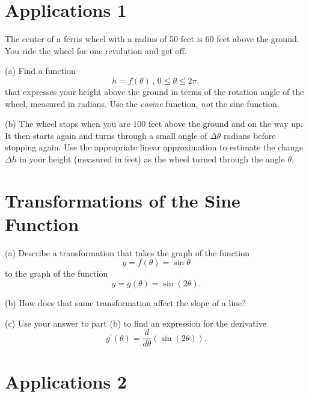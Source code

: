 \documentclass{ximera}
\begin{document}
\section{Applications 1}
\begin{question}  \label{Q5dgdgnbhyhy4}
The center of a ferris wheel with a radius of 50 feet is 60 feet above the ground. You ride the wheel for one revolution and get off.

(a) Find a function 
\[
 h = f(\theta) \, , \, 0\leq \theta \leq 2\pi ,
\] 
that expresses your height above the ground in terms of the rotation angle of the wheel, measured in radians. Use the \emph{cosine} function, \emph{not} the sine function.

(b) The wheel stops when you are $100$ feet above the ground and on the way up. It then starts again and turns through a small angle of $\Delta \theta$ radians before stopping again. Use the appropriate linear approximation to estimate the change $\Delta h$ in your height (measured in feet) as the wheel turned through the angle $\theta$.

\begin{onlineOnly}
    \begin{center}
\end{center}
\end{onlineOnly}


\end{question}


\section{Transformations of the Sine Function}
\begin{question}  \label{Q:gsdfgdfgfdsfd}
(a) Describe a transformation that takes the graph of the function
\[
   y  = f(\theta) =  \sin\theta
\]
to the graph of the function
\[
   y = g(\theta) = \sin (2\theta).
\]

(b) How does that same transformation affect the slope of a line?

(c) Use your answer to part (b) to find an expression for the derivative
\[
    g^\prime(\theta)  = \frac{d}{d\theta} \left(  \sin(2\theta) \right) .
\] 

\end{question}


\section{Applications 2}
\end{document}
